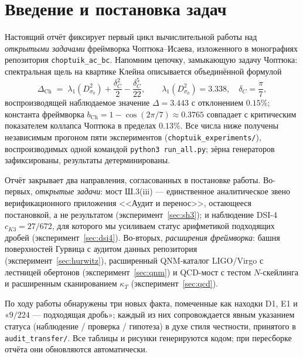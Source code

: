 \documentclass[11pt,a4paper]{article}
\begin{document}
\tableofcontents
\newpage

\section{Введение и постановка задач}\label{sec:intro}

Настоящий отчёт фиксирует первый цикл вычислительной работы над \emph{открытыми
задачами} фреймворка Чоптюка--Исаева, изложенного в монографиях репозитория
\texttt{choptuik\_ac\_bc}. Напомним цепочку, замыкающую задачу Чоптюка: спектральная
щель на квартике Клейна описывается объединённой формулой
\begin{equation}\label{eq:ch}
\Delta_{\mathrm{Ch}} \;=\; \lambda_1(D^2_{\sigma_0}) + \frac{\delta_C^2}{2} - \frac{\delta_C^5}{22},
\qquad \lambda_1(D^2_{\sigma_0}) = 3.338,\quad \delta_C = \frac{\pi}{7},
\end{equation}
воспроизводящей наблюдаемое значение $\Delta = 3.443$ с отклонением $0.15\%$;
константа фреймворка $b_{\mathrm{Ch}} = 1-\cos(2\pi/7) \approx 0.3765$ совпадает
с критическим показателем коллапса Чоптюка в пределах $0.13\%$. Все числа ниже
получены независимым прогоном пяти экспериментов
(\texttt{choptuik\_experiments/}), воспроизводимых одной командой
\texttt{python3 run\_all.py}; зёрна генераторов зафиксированы, результаты
детерминированы.

Отчёт закрывает два направления, согласованных в постановке работы. Во-первых,
\emph{открытые задачи}: мост Ш.3(iii) --- единственное аналитическое звено
верификационного приложения <<Аудит и перенос>>, остающееся постановкой, а не
результатом (эксперимент~\ref{sec:sh3}); и наблюдение DSI-4 $c_{K3} = 27/672$,
для которого мы усиливаем статус арифметикой подходящих дробей
(эксперимент~\ref{sec:dsi4}). Во-вторых, \emph{расширения фреймворка}: башня
поверхностей Гурвица с аудитом данных репозитория (эксперимент~\ref{sec:hurwitz}),
расширенный QNM-каталог LIGO/Virgo с лестницей обертонов
(эксперимент~\ref{sec:qnm}) и QCD-мост с тестом $N$-скейлинга и расширенным
сканированием $\kappa_T$ (эксперимент~\ref{sec:qcd}).

По ходу работы обнаружены три новых факта, помеченные как находки D1, E1 и
«$9/224$ --- подходящая дробь»; каждый из них сопровождается явным указанием
статуса (наблюдение / проверка / гипотеза) в духе стиля честности, принятого
в \texttt{audit\_transfer/}. Все таблицы и рисунки генерируются кодом; при
пересборке отчёта они обновляются автоматически.
\end{document}
